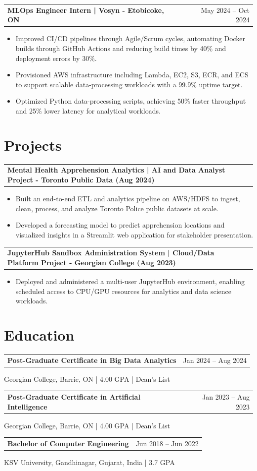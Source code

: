 \documentclass[10.5pt,letterpaper]{article}
\makeatletter
\newcommand{\resumeRow}[2]{%
  \noindent\begin{tabularx}{\linewidth}{@{}X r@{}}
    \textbf{#1} & #2 \\
  \end{tabularx}%
}
\makeatother
\begin{document}
\resumeRow{MLOps Engineer Intern | Vosyn - Etobicoke, ON}{May 2024 -- Oct 2024}
\begin{itemize}
  \item Improved CI/CD pipelines through Agile/Scrum cycles, automating Docker builds through GitHub Actions and reducing build times by 40\% and deployment errors by 30\%.
  \item Provisioned AWS infrastructure including Lambda, EC2, S3, ECR, and ECS to support scalable data-processing workloads with a 99.9\% uptime target.
  \item Optimized Python data-processing scripts, achieving 50\% faster throughput and 25\% lower latency for analytical workloads.
\end{itemize}

\section{Projects}
\resumeRow{Mental Health Apprehension Analytics | AI and Data Analyst Project - Toronto Public Data (Aug 2024)}{}
\begin{itemize}
  \item Built an end-to-end ETL and analytics pipeline on AWS/HDFS to ingest, clean, process, and analyze Toronto Police public datasets at scale.
  \item Developed a forecasting model to predict apprehension locations and visualized insights in a Streamlit web application for stakeholder presentation.
\end{itemize}
\resumeRow{JupyterHub Sandbox Administration System | Cloud/Data Platform Project - Georgian College (Aug 2023)}{}
\begin{itemize}
  \item Deployed and administered a multi-user JupyterHub environment, enabling scheduled access to CPU/GPU resources for analytics and data science workloads.
\end{itemize}

\section{Education}
\resumeRow{Post-Graduate Certificate in Big Data Analytics}{Jan 2024 -- Aug 2024}
{\small Georgian College, Barrie, ON | 4.00 GPA | Dean's List}\\[2pt]\resumeRow{Post-Graduate Certificate in Artificial Intelligence}{Jan 2023 -- Aug 2023}
{\small Georgian College, Barrie, ON | 4.00 GPA | Dean's List}\\[2pt]\resumeRow{Bachelor of Computer Engineering}{Jun 2018 -- Jun 2022}
{\small KSV University, Gandhinagar, Gujarat, India | 3.7 GPA}
\end{document}
